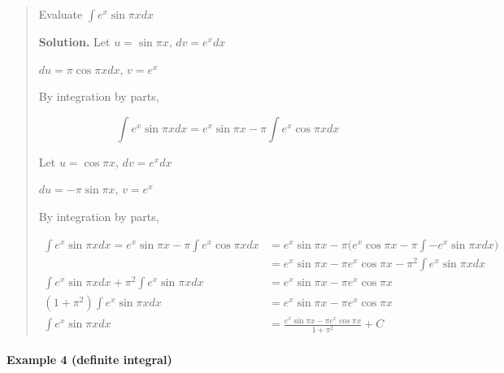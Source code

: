 \documentclass[
]{article}
\begin{document}
\begin{quote}
Evaluate \(\displaystyle \int e^x \sin {\pi x}dx\)

\textbf{Solution.} Let \(u = \sin {\pi x}\), \(dv = e^x dx\)

\(du = \pi \cos {\pi x}dx\), \(v = e^x\)

By integration by parts,

\[ \int e^x \sin {\pi x}dx = e^x \sin {\pi x} - \pi \int e^x \cos {\pi x}dx \]

Let \(u = \cos {\pi x}\), \(dv = e^xdx\)

\(du = -\pi \sin {\pi x}\), \(v = e^x\)

By integration by parts,

\begin{align*}
\int e^x \sin {\pi x}dx = e^x \sin {\pi x} - \pi \int e^x \cos {\pi x}dx &= e^x \sin {\pi x} - \pi \Big(e^x\cos {\pi x} - \pi \int - e^x \sin {\pi x}dx \Big)\\
&=  e^x \sin {\pi x} - \pi e^x\cos {\pi x} - \pi^2 \int  e^x \sin {\pi x}dx \\
\int e^x \sin {\pi x}dx + \pi^2 \int  e^x \sin {\pi x}dx &= e^x \sin {\pi x} - \pi e^x\cos {\pi x}\\
(1 + \pi^2) \int e^x \sin {\pi x}dx &= e^x \sin {\pi x} - \pi e^x\cos {\pi x}\\
\int e^x \sin {\pi x}dx &= \frac{e^x \sin {\pi x} - \pi e^x\cos {\pi x}}{1 + \pi^2} + C
\end{align*}
\end{quote}

\hypertarget{example-4-definite-integral}{%
\paragraph*{Example 4 (definite
integral)}\label{example-4-definite-integral}}
\end{document}
